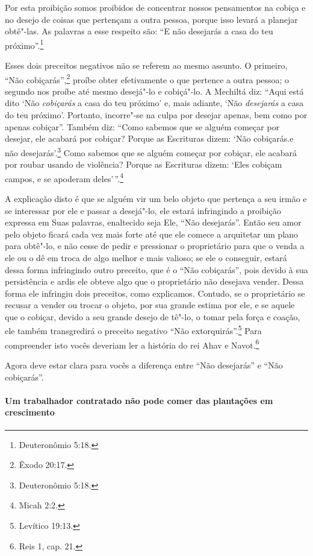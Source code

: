 \begin{multicols}{2}
Por esta proibição somos proibidos de concentrar nossos pensamentos na
cobiça e no desejo de coisas que pertençam a outra pessoa, porque isso
levará a planejar obtê"-las. As palavras a esse respeito são: ``E não
desejarás a casa do teu próximo''.\footnote{Deuteronômio 5:18.}

Esses dois preceitos negativos não se referem ao mesmo assunto. O
primeiro, ``Não cobiçarás'',\footnote{Êxodo 20:17.} proíbe obter efetivamente o
que pertence a outra pessoa; o segundo nos proíbe até mesmo desejá"-lo e
cobiçá"-lo. A Mechiltá\starr{} diz: ``Aqui está dito `Não \emph{cobiçarás} a casa
do teu próximo' e, mais adiante, `Não \emph{desejarás} a casa do teu
próximo'. Portanto, incorre"-se na culpa por desejar apenas, bem como por
apenas cobiçar''. Também diz: ``Como sabemos que se alguém começar por
desejar, ele acabará por cobiçar? Porque as Escrituras dizem: `Não
cobiçarás.e não desejarás'.\footnote{Deuteronômio 5:18.} Como sabemos que se
alguém começar por cobiçar, ele acabará por roubar usando de violência?
Porque as Escrituras dizem: `Eles cobiçam campos, e se apoderam
deles'\,''.\footnote{Micah 2:2.}

A explicação disto é que se alguém vir um belo objeto que pertença a seu
irmão e se interessar por ele e passar a desejá"-lo, ele estará
infringindo a proibição expressa em Suas palavras, enaltecido seja Ele,
``Não desejarás''. Então seu amor pelo objeto ficará cada vez mais forte
até que ele comece a arquitetar um plano para obtê"-lo, e não cesse de
pedir e pressionar o proprietário para que o venda a ele ou o dê em
troca de algo melhor e mais valioso; se ele o conseguir, estará dessa
forma infringindo outro preceito, que é o ``Não cobiçarás'', pois
devido à sua persistência e ardis ele obteve algo que o proprietário não
desejava vender. Dessa forma ele infringiu dois preceitos, como
explicamos. Contudo, se o proprietário se recusar a vender ou trocar o
objeto, por sua grande estima por ele, e se aquele que o cobiçar, devido
a seu grande desejo de tê"-lo, o tomar pela força e coação, ele também
transgredirá o preceito negativo ``Não extorquirás''.\footnote{Levítico 19:13.}
Para compreender isto vocês deveriam ler a história do rei Ahav\starr{} e
Navot\starr.\footnote{Reis 1, cap. 21.}

Agora deve estar clara para vocês a diferença entre ``Não desejarás'' e
``Não cobiçarás''.

\paragraph{Um trabalhador contratado não pode comer das plantações em crescimento}


\end{multicols}
